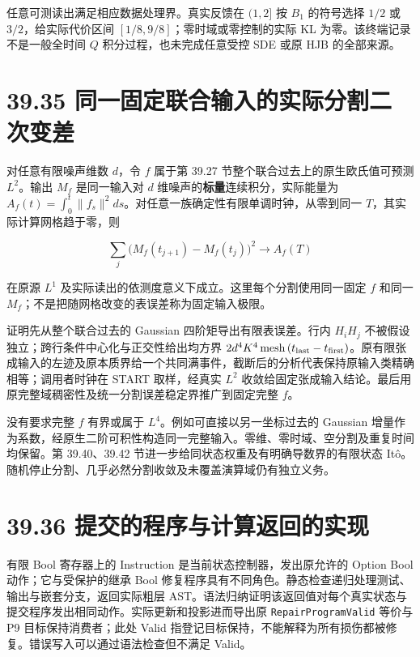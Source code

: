 \documentclass[
  11pt,
  oneside]{book}
\begin{document}
任意可测读出满足相应数据处理界。真实反馈在 \((1,2]\) 按 \(B_1\) 的符号选择 \(1/2\) 或 \(3/2\)，给实际代价区间 \([1/8,9/8]\)；零时域或零控制的实际 KL 为零。该终端记录不是一般全时间 \(Q\) 积分过程，也未完成任意受控 SDE 或原 HJB 的全部来源。

\section{39.35 同一固定联合输入的实际分割二次变差}\label{ux540cux4e00ux56faux5b9aux8054ux5408ux8f93ux5165ux7684ux5b9eux9645ux5206ux5272ux4e8cux6b21ux53d8ux5dee}

对任意有限噪声维数 \(d\)，令 \(f\) 属于第 39.27 节整个联合过去上的原生欧氏值可预测 \(L^2\)。输出 \(M_f\) 是同一输入对 \(d\) 维噪声的\textbf{标量}连续积分，实际能量为 \(A_f(t)=\int_0^t\|f_s\|^2ds\)。对任意一族确定性有限单调时钟，从零到同一 \(T\)，其实际计算网格趋于零，则

\[\sum_j\bigl(M_f(t_{j+1})-M_f(t_j)\bigr)^2
\longrightarrow A_f(T)\]

在原源 \(L^1\) 及实际读出的依测度意义下成立。这里每个分割使用同一固定 \(f\) 和同一 \(M_f\)；不是把随网格改变的表误差称为固定输入极限。

证明先从整个联合过去的 Gaussian 四阶矩导出有限表误差。行内 \(H_iH_j\) 不被假设独立；跨行条件中心化与正交性给出均方界 \(2d^4K^4\,\mathrm{mesh}\,(t_{\rm last}-t_{\rm first})\)。原有限张成输入的左迹及原本质界给一个共同满事件，截断后的分析代表保持原输入类精确相等；调用者时钟在 START 取样，经真实 \(L^2\) 收敛给固定张成输入结论。最后用原完整域稠密性及统一分割误差稳定界推广到固定完整 \(f\)。

没有要求完整 \(f\) 有界或属于 \(L^4\)。例如可直接以另一坐标过去的 Gaussian 增量作为系数，经原生二阶可积性构造同一完整输入。零维、零时域、空分割及重复时间均保留。第 39.40、39.42 节进一步给同状态权重及有明确导数界的有限状态 Itô。随机停止分割、几乎必然分割收敛及未覆盖演算域仍有独立义务。

\section{39.36 提交的程序与计算返回的实现}\label{ux63d0ux4ea4ux7684ux7a0bux5e8fux4e0eux8ba1ux7b97ux8fd4ux56deux7684ux5b9eux73b0}

有限 Bool 寄存器上的 Instruction 是当前状态控制器，发出原允许的 Option Bool 动作；它与受保护的继承 Bool 修复程序具有不同角色。静态检查递归处理测试、输出与嵌套分支，返回实际粗层 AST。语法归纳证明该返回值对每个真实状态与提交程序发出相同动作。实际更新和投影进而导出原 \nolinkurl{RepairProgramValid} 等价与 P9 目标保持消费者；此处 Valid 指登记目标保持，不能解释为所有损伤都被修复。错误写入可以通过语法检查但不满足 Valid。
\end{document}
